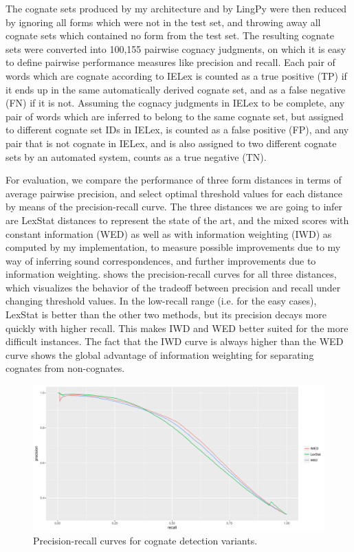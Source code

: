 The cognate sets produced by my architecture and by LingPy were then reduced by ignoring all forms which were not in the test set, and throwing away all cognate sets which contained no form from the test set. The resulting cognate sets were converted into 100,155 pairwise cognacy judgments, on which it is easy to define pairwise performance measures like precision and recall. Each pair of words which are cognate according to IELex is counted as a true positive (TP) if it ends up in the same automatically derived cognate set, and as a false negative (FN) if it is not. Assuming the cognacy judgments in IELex to be complete, any pair of words which are inferred to belong to the same cognate set, but assigned to different cognate set IDs in IELex, is counted as a false positive (FP), and any pair that is not cognate in IELex, and is also assigned to two different cognate sets by an automated system, counts as a true negative (TN).

For evaluation, we compare the performance of three form distances in terms of average pairwise precision, and select optimal threshold values for each distance by means of the precision-recall curve. The three distances we are going to infer are LexStat distances to represent the state of the art, and the mixed scores with constant information (WED) as well as with information weighting (IWD) as computed by my implementation, to measure possible improvements due to my way of inferring sound correspondences, and further improvements due to information weighting.  shows the precision-recall curves for all three distances, which visualizes the behavior of the tradeoff between precision and recall under changing threshold values. In the low-recall range (i.e. for the easy cases), LexStat is better than the other two methods, but its precision decays more quickly with higher recall. This makes IWD and WED better suited for the more difficult instances. The fact that the IWD curve is always higher than the WED curve shows the global advantage of information weighting for separating cognates from non-cognates.

\begin{figure}[ht]
 \includegraphics[width=\textwidth]{figures/precision-recall-curves.pdf}
 \caption{Precision-recall curves for cognate detection variants.}
 \label{precision-recall-curves}
\end{figure}

